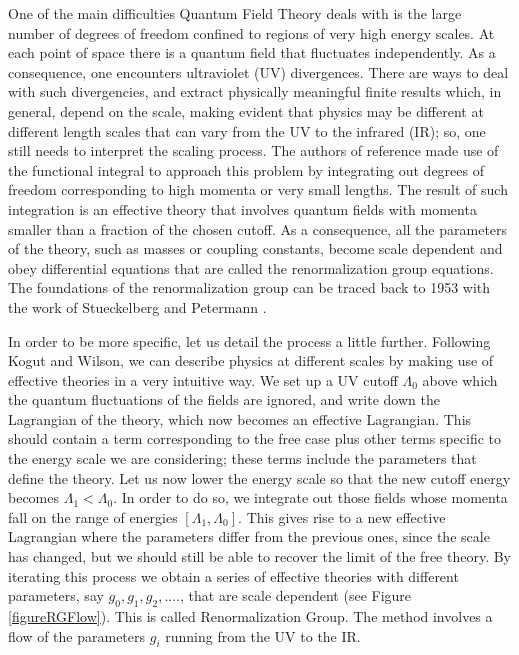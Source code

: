 \documentclass[12pt,a4paper]{article}
\numberwithin{equation}{section}
\begin{document}
One of the main difficulties Quantum Field Theory deals with is the large number of degrees of freedom confined to regions of very high energy scales. At each point of space there is a quantum field that fluctuates independently. As a consequence, one encounters ultraviolet (UV) divergences. There are ways to deal with such divergencies, and extract physically meaningful finite results which, in general, depend on the scale, making evident that physics may be different at different length scales that can vary from the UV to the infrared (IR); so, one still needs to interpret the scaling process. The authors of reference \cite{wilson} made use of the functional integral to approach this problem by integrating out degrees of freedom corresponding to high momenta or very small lengths. The result of such integration is an effective theory that involves quantum fields with momenta smaller than a fraction of the chosen cutoff. As a consequence, all the parameters of the theory, such as masses or coupling constants, become scale dependent and obey differential equations that are called the renormalization group equations. The foundations of the renormalization group can be traced back to 1953 with the work of Stueckelberg and Petermann \cite{stueckelberg_petermann}.

In order to be more specific, let us detail the process a little further. Following Kogut and Wilson, we can describe physics at different scales by making use of effective theories in a very intuitive way. We set up a UV cutoff $\Lambda_0$ above which the quantum fluctuations of the fields are ignored, and write down the Lagrangian of the theory, which now becomes an effective Lagrangian. This should contain a term corresponding to the free case plus other terms specific to the energy scale we are considering; these terms include the parameters that define the theory. Let us now lower the energy scale so that the new cutoff energy becomes $\Lambda_1<\Lambda_0$. In order to do so, we integrate out those fields whose momenta fall on the range of energies $[\Lambda_1,\Lambda_0]$. This gives rise to a new effective Lagrangian where the parameters differ from the previous ones, since the scale has changed, but we should still be able to recover the limit of the free theory. By iterating this process we obtain a series of effective theories with different parameters, say $g_0, g_1, g_2,....$, that are scale dependent (see Figure \ref{figureRGFlow}). This is called Renormalization Group.
The method involves a flow of the parameters $g_i$ running from the UV to the IR.
\end{document}
